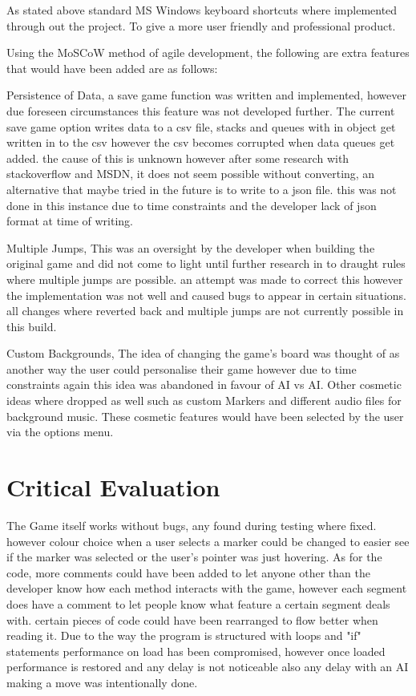 \documentclass[10pt, a4paper]{article}
\begin{document}
As stated above standard MS Windows keyboard shortcuts where implemented through out the project. To give a more user friendly and professional product. 


Using the MoSCoW method of agile development, the following are extra features that would have been added are as follows:

Persistence of Data, a save game function was written and implemented, however due foreseen circumstances this feature was not developed further. The current save game option writes data to a csv file, stacks and queues with in object get written in to the csv however the csv becomes corrupted when data queues get added. the cause of this is unknown however after some research with stackoverflow and MSDN, it does not seem possible without converting, an alternative that maybe tried in the future is to write to a json file. this was not done in this instance due to time constraints and the developer lack of json format at time of writing.

Multiple Jumps, This was an oversight by the developer when building the original game and did not come to light until further research in to draught rules where multiple jumps are possible. an attempt was made to correct this however the implementation was not well and caused bugs to appear in certain situations. all changes where reverted back and multiple jumps are not currently possible in this build.

Custom Backgrounds, The idea of changing the game's board was thought of as another way the user could personalise their game however due to time constraints again this idea was abandoned in favour of AI vs AI. Other cosmetic ideas where dropped as well such as custom Markers and different audio files for background music. These cosmetic features would have been selected by the user via the options menu. 
	
	\section{Critical Evaluation}
The Game itself works without bugs, any found during testing where fixed. however colour choice when a user selects a marker could be changed to easier see if the marker was selected or the user's pointer was just hovering. As for the code, more comments could have been added to let anyone other than the developer know how each method interacts with the game, however each segment does have a comment to let people know what feature a certain segment deals with. certain pieces of code could have been rearranged to flow better when reading it. Due to the way the program is structured with loops and "if" statements performance on load has been compromised, however once loaded performance is restored and any delay is not noticeable also any delay with an AI making a move was intentionally done.
\end{document}
